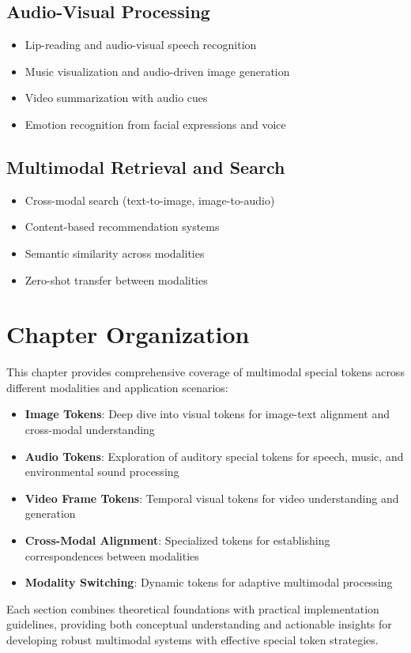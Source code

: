 \subsection{Audio-Visual Processing}
\begin{itemize}
\item Lip-reading and audio-visual speech recognition
\item Music visualization and audio-driven image generation
\item Video summarization with audio cues
\item Emotion recognition from facial expressions and voice
\end{itemize}

\subsection{Multimodal Retrieval and Search}
\begin{itemize}
\item Cross-modal search (text-to-image, image-to-audio)
\item Content-based recommendation systems
\item Semantic similarity across modalities
\item Zero-shot transfer between modalities
\end{itemize}

\section{Chapter Organization}

This chapter provides comprehensive coverage of multimodal special tokens across different modalities and application scenarios:

\begin{itemize}
\item \textbf{Image Tokens}: Deep dive into visual tokens for image-text alignment and cross-modal understanding
\item \textbf{Audio Tokens}: Exploration of auditory special tokens for speech, music, and environmental sound processing
\item \textbf{Video Frame Tokens}: Temporal visual tokens for video understanding and generation
\item \textbf{Cross-Modal Alignment}: Specialized tokens for establishing correspondences between modalities
\item \textbf{Modality Switching}: Dynamic tokens for adaptive multimodal processing
\end{itemize}

Each section combines theoretical foundations with practical implementation guidelines, providing both conceptual understanding and actionable insights for developing robust multimodal systems with effective special token strategies.
